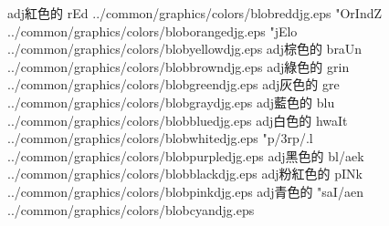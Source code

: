 ﻿%







\begin{tGegzkD}{6}{}
     {adj}{紅色的}   {}{rEd}           {../common/graphics/colors/blobreddjg.eps}     {}     {}{"OrIndZ}       {../common/graphics/colors/bloborangedjg.eps}  {}
     {}{"jElo}         {../common/graphics/colors/blobyellowdjg.eps}  {}   {adj}{棕色的}   {}{braUn}         {../common/graphics/colors/blobbrowndjg.eps}   {}
   {adj}{綠色的}   {}{grin}          {../common/graphics/colors/blobgreendjg.eps}   {}    {adj}{灰色的}   {}{gre}           {../common/graphics/colors/blobgraydjg.eps}    {}
    {adj}{藍色的}   {}{blu}           {../common/graphics/colors/blobbluedjg.eps}    {}   {adj}{白色的}   {}{hwaIt}         {../common/graphics/colors/blobwhitedjg.eps}   {}
     {}{"p{/3r}p{/.l}} {../common/graphics/colors/blobpurpledjg.eps}  {}   {adj}{黑色的}   {}{bl{/ae}k}       {../common/graphics/colors/blobblackdjg.eps}   {}
    {adj}{粉紅色的} {}{pINk}          {../common/graphics/colors/blobpinkdjg.eps}    {}    {adj}{青色的}   {}{"saI{/ae}n}     {../common/graphics/colors/blobcyandjg.eps}    {}
\end{tGegzkD}%


